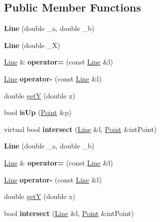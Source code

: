 \subsection*{Public Member Functions}
\begin{DoxyCompactItemize}
\item 
\hypertarget{classLine_a7a28a259e16334fce3954a07f5a7d560}{{\bfseries Line} (double \-\_\-a, double \-\_\-b)}\label{classLine_a7a28a259e16334fce3954a07f5a7d560}

\item 
\hypertarget{classLine_a82c516dfe89c6fe1f8d6c7fd4e4c3365}{{\bfseries Line} (double \-\_\-\-X)}\label{classLine_a82c516dfe89c6fe1f8d6c7fd4e4c3365}

\item 
\hypertarget{classLine_aefa59ccadcf3d41ff8eda0956fa0328e}{\hyperlink{classLine}{Line} \& {\bfseries operator=} (const \hyperlink{classLine}{Line} \&l)}\label{classLine_aefa59ccadcf3d41ff8eda0956fa0328e}

\item 
\hypertarget{classLine_a38634910f5a383f509f469e6d933460f}{\hyperlink{classLine}{Line} {\bfseries operator-\/} (const \hyperlink{classLine}{Line} \&l)}\label{classLine_a38634910f5a383f509f469e6d933460f}

\item 
double \hyperlink{classLine_a3d15d876c9e5405948078bcaa20fa1ce}{get\-Y} (double x)
\item 
\hypertarget{classLine_af7e031cb0df26db42dcd6b9dc3143378}{bool {\bfseries is\-Up} (\hyperlink{structPoint}{Point} \&p)}\label{classLine_af7e031cb0df26db42dcd6b9dc3143378}

\item 
\hypertarget{classLine_a77c4f413c7bcbb5f6b1bef061791c504}{virtual bool {\bfseries intersect} (\hyperlink{classLine}{Line} \&l, \hyperlink{structPoint}{Point} \&int\-Point)}\label{classLine_a77c4f413c7bcbb5f6b1bef061791c504}

\item 
\hypertarget{classLine_a7a28a259e16334fce3954a07f5a7d560}{{\bfseries Line} (double \-\_\-a, double \-\_\-b)}\label{classLine_a7a28a259e16334fce3954a07f5a7d560}

\item 
\hypertarget{classLine_ab29b6a1ce88c16bb1ed422ecffce61b2}{\hyperlink{classLine}{Line} \& {\bfseries operator=} (const \hyperlink{classLine}{Line} \&l)}\label{classLine_ab29b6a1ce88c16bb1ed422ecffce61b2}

\item 
\hypertarget{classLine_a38634910f5a383f509f469e6d933460f}{\hyperlink{classLine}{Line} {\bfseries operator-\/} (const \hyperlink{classLine}{Line} \&l)}\label{classLine_a38634910f5a383f509f469e6d933460f}

\item 
double \hyperlink{classLine_a3d15d876c9e5405948078bcaa20fa1ce}{get\-Y} (double x)
\item 
\hypertarget{classLine_a77c4f413c7bcbb5f6b1bef061791c504}{bool {\bfseries intersect} (\hyperlink{classLine}{Line} \&l, \hyperlink{structPoint}{Point} \&int\-Point)}\label{classLine_a77c4f413c7bcbb5f6b1bef061791c504}

\end{DoxyCompactItemize}
